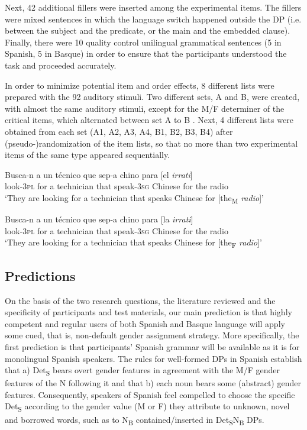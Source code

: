 \documentclass[output=paper]{langscibook}
\begin{document}
Next, 42 additional fillers were inserted among the experimental items. The fillers were mixed sentences in which the language switch happened outside the DP (i.e. between the subject and the predicate, or the main and the embedded clause). Finally, there were 10 quality control unilingual grammatical sentences (5 in Spanish, 5 in Basque) in order to ensure that the participants understood the task and proceeded accurately.

In order to minimize potential item and order effects, 8 different lists were prepared with the 92 auditory stimuli. Two different sets, A and B, were created, with almost the same auditory stimuli, except for the M/F determiner of the critical items, which alternated between set A  to B . Next, 4 different lists were obtained from each set (A1, A2, A3, A4, B1, B2, B3, B4) after (pseudo-)randomization of the item lists, so that no more than two experimental items of the same type appeared sequentially.

\ea%
    \label{ex:ezeiza:18}

\ea \label{ex:ezeiza:18a}
\gll Busca-n   a  un técnico        que  sep-a       chino     para [el \textit{irrati}]\\
            look-3\textsc{pl} for a  technician   that  speak-3\textsc{sg}  Chinese for   the radio\\
\glt           ‘They are looking for a technician that speaks Chinese for [the\textsubscript{M} \textit{radio}]’

\ex \label{ex:ezeiza:18b}
\gll Busca-n   a  un técnico        que  sep-a       chino     para [la \textit{irrati}]\\
            look-3\textsc{pl} for a  technician   that  speak-3\textsc{sg}  Chinese for   the radio\\
\glt          ‘They are looking for a technician that speaks Chinese for [the\textsubscript{F} \textit{radio}]’
    \z
    \z

\subsection{Predictions}\label{sec:ezeiza:3.4}

On the basis of the two research questions, the literature reviewed and the specificity of participants and test materials, our main prediction is that highly competent and regular users of both Spanish and Basque language will apply some cued, that is, non-default gender assignment strategy. More specifically, the first prediction is that participants’ Spanish grammar will be available as it is for monolingual Spanish speakers. The rules for well-formed DPs in Spanish establish that a) Det\textsubscript{S} bears overt gender features in agreement with the M/F gender features of the N following it and that b) each noun bears some (abstract) gender features. Consequently, speakers of Spanish feel compelled to choose the specific Det\textsubscript{S} according to the gender value (M or F) they attribute to unknown, novel and borrowed words, such as to N\textsubscript{B} contained/inserted in Det\textsubscript{S}N\textsubscript{B} DPs.
\end{document}
